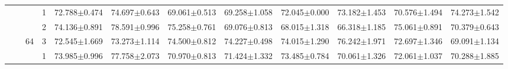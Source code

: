 \begin{table}[htpb]
{\begin{tabular}{c|c|c|c|rr|rr|rr|rr}
                                 &                                                                                 &                                                                                        & 1                                                                                         & 72.788$\pm$0.474                        & 74.697$\pm$0.643                        & 69.061$\pm$0.513                        & 69.258$\pm$1.058                        & 72.045$\pm$0.000                        & 73.182$\pm$1.453                        & 70.576$\pm$1.494                        & 74.273$\pm$1.542                       \\
                                 &                                                                                 &                                                                                        & 2                                                                                         & 74.136$\pm$0.891                        & 78.591$\pm$0.996                        & 75.258$\pm$0.761                        & 69.076$\pm$0.813                        & 68.015$\pm$1.318                        & 66.318$\pm$1.185                        & 75.061$\pm$0.891                        & 70.379$\pm$0.643                       \\
                                 &                                                                                 & \multirow{-3}{*}{64}                                                                   & 3                                                                                         & 72.545$\pm$1.669                        & 73.273$\pm$1.114                        & 74.500$\pm$0.812                        & 74.227$\pm$0.498                        & 74.015$\pm$1.290                        & 76.242$\pm$1.971                        & 72.697$\pm$1.346                        & 69.091$\pm$1.134                       \\ \cline{3-12} 
                                 &                                                                                 &                                                                                        & 1                                                                                         & 73.985$\pm$0.996                        & 77.758$\pm$2.073                        & 70.970$\pm$0.813                        & 71.424$\pm$1.332                        & 73.485$\pm$0.784                        & 70.061$\pm$1.326                        & 72.061$\pm$1.037                        & 70.288$\pm$1.885                       \\

\end{tabular}}
\end{table}
